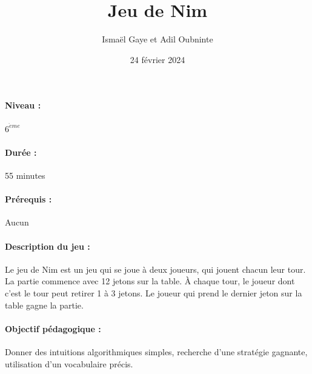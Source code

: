 \documentclass[12pt, a4paper]{article}
\begin{document}
	
	\title{Jeu de Nim}
	\author{Ismaël Gaye et Adil Oubninte}
	\date{24 février 2024}
	\maketitle
	
	\paragraph*{Niveau :} $6^{\grave{e}me}$
	\paragraph*{Durée :} 55 minutes
	\paragraph*{Prérequis :} Aucun
	\paragraph*{Description du jeu :}
	Le jeu de Nim est un jeu qui se joue à deux joueurs, qui jouent chacun leur tour. La partie commence avec 12 jetons sur la table. À chaque tour, le joueur dont c'est le tour peut retirer 1 à 3 jetons. Le joueur qui prend le dernier jeton sur la table gagne la partie.
	
	\paragraph*{Objectif pédagogique :}
	Donner des intuitions algorithmiques simples, recherche d'une stratégie gagnante, utilisation d'un vocabulaire précis.
	
\end{document}
